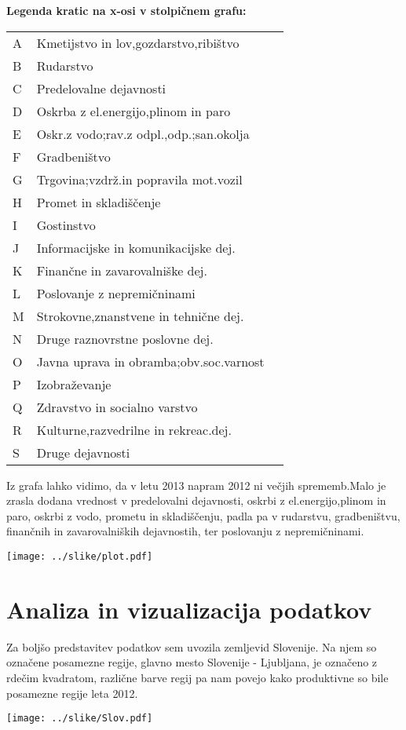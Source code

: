 \documentclass[a4paper, 11pt]{article}
\begin{document}
\textbf{Legenda kratic na x-osi v stolpičnem grafu:}
\begin{table}[h]
\begin{tabular}{lll}
A  & Kmetijstvo in lov,gozdarstvo,ribištvo \\
B & Rudarstvo  \\
C & Predelovalne dejavnosti  \\
D & Oskrba z el.energijo,plinom in paro  \\
E & Oskr.z vodo;rav.z odpl.,odp.;san.okolja	\\
F & Gradbeništvo	\\
G & Trgovina;vzdrž.in popravila mot.vozil	\\
H & Promet in skladiščenje	\\
I & Gostinstvo	\\
J & Informacijske in komunikacijske dej.\\	
K & Finančne in zavarovalniške dej.	\\
L & Poslovanje z nepremičninami	\\
M & Strokovne,znanstvene in tehnične dej.	\\
N & Druge raznovrstne poslovne dej.	\\
O & Javna uprava in obramba;obv.soc.varnost \\
P & Izobraževanje	\\
Q & Zdravstvo in socialno varstvo	\\
R & Kulturne,razvedrilne in rekreac.dej.\\	
S & Druge dejavnosti
\end{tabular}
\end{table}

Iz grafa lahko vidimo, da v letu 2013 napram 2012 ni večjih sprememb.Malo je zrasla dodana vrednost v predelovalni dejavnosti, oskrbi z el.energijo,plinom in paro, oskrbi z vodo, prometu in skladiščenju, padla pa v rudarstvu, gradbeništvu, finančnih in zavarovalniških dejavnostih, ter poslovanju z nepremičninami.\\


\begin{center}

\texttt{[image: ../slike/plot.pdf]}
\end{center}

\section{Analiza in vizualizacija podatkov}
Za boljšo predstavitev podatkov sem uvozila zemljevid Slovenije. Na njem so označene posamezne regije, glavno mesto Slovenije - Ljubljana, je označeno z rdečim kvadratom, različne barve regij pa nam povejo kako produktivne so bile posamezne regije leta 2012.
\newpage
\begin{center}
\texttt{[image: ../slike/Slov.pdf]}
\end{center}
\end{document}
